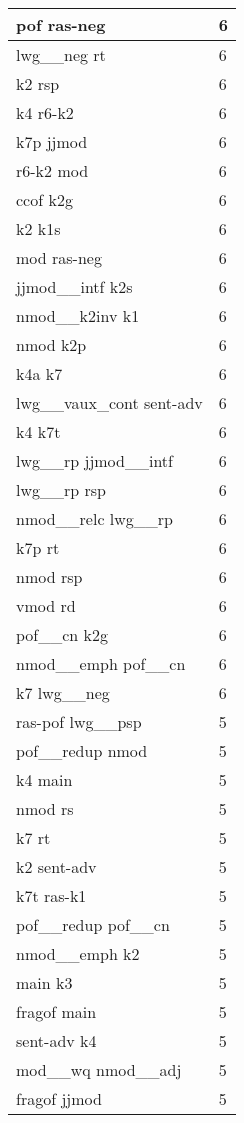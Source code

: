 \documentclass[a4 paper]{article}
\begin{document}
\begin{longtable}{p{}p{}}
pof ras-neg  & 6 \\ \midrule
lwg\_\_neg rt  & 6 \\ \midrule
k2 rsp  & 6 \\ \midrule
k4 r6-k2  & 6 \\ \midrule
k7p jjmod  & 6 \\ \midrule
r6-k2 mod  & 6 \\ \midrule
ccof k2g  & 6 \\ \midrule
k2 k1s  & 6 \\ \midrule
mod ras-neg  & 6 \\ \midrule
jjmod\_\_intf k2s  & 6 \\ \midrule
nmod\_\_k2inv k1  & 6 \\ \midrule
nmod k2p  & 6 \\ \midrule
k4a k7  & 6 \\ \midrule
lwg\_\_vaux\_cont sent-adv  & 6 \\ \midrule
k4 k7t  & 6 \\ \midrule
lwg\_\_rp jjmod\_\_intf  & 6 \\ \midrule
lwg\_\_rp rsp  & 6 \\ \midrule
nmod\_\_relc lwg\_\_rp  & 6 \\ \midrule
k7p rt  & 6 \\ \midrule
nmod rsp  & 6 \\ \midrule
vmod rd  & 6 \\ \midrule
pof\_\_cn k2g  & 6 \\ \midrule
nmod\_\_emph pof\_\_cn  & 6 \\ \midrule
k7 lwg\_\_neg  & 6 \\ \midrule
ras-pof lwg\_\_psp  & 5 \\ \midrule
pof\_\_redup nmod  & 5 \\ \midrule
k4 main  & 5 \\ \midrule
nmod rs  & 5 \\ \midrule
k7 rt  & 5 \\ \midrule
k2 sent-adv  & 5 \\ \midrule
k7t ras-k1  & 5 \\ \midrule
pof\_\_redup pof\_\_cn  & 5 \\ \midrule
nmod\_\_emph k2  & 5 \\ \midrule
main k3  & 5 \\ \midrule
fragof main  & 5 \\ \midrule
sent-adv k4  & 5 \\ \midrule
mod\_\_wq nmod\_\_adj  & 5 \\ \midrule
fragof jjmod  & 5 \\ \midrule

\end{longtable}
\end{document}

